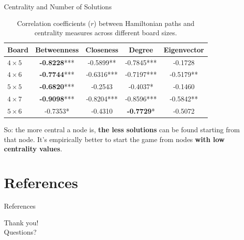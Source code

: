 \documentclass{beamer}
\begin{document}
	\begin{frame}{Centrality and Number of Solutions}
		\begin{table}[ht]
			\centering
			\setlength{\tabcolsep}{4pt}
			\begin{tabular}{|l|cccc|}
				\hline
				Board & Betweenness & Closeness & Degree & Eigenvector \\
				\hline
				$4 \times 5$ & \textbf{-0.8228}*** & -0.5899** & -0.7845*** & -0.1728 \\
				$4 \times 6$ & \textbf{-0.7744}*** & -0.6316*** & -0.7197*** & -0.5179** \\
				$5 \times 5$ & \textbf{-0.6820}*** & -0.2543 & -0.4037* & -0.1460 \\
				$4 \times 7$ & \textbf{-0.9098}*** & -0.8204*** & -0.8596*** & -0.5842** \\
				$5 \times 6$ & -0.7353* & -0.4310 & \textbf{-0.7729}* & -0.5072 \\
				\hline
			\end{tabular}
			\caption{Correlation coefficients ($r$) between Hamiltonian paths and centrality measures across different board sizes.}
			\label{tab:correlations}
		\end{table}
		So: the more central a node is, \textbf{the less solutions} can be found starting from that node. It's empirically better to start the game from nodes \textbf{with low centrality values}.
	\end{frame}
	
	\section{References}
	
	\begin{frame}[allowframebreaks]{References}
		\nocite{hopido,apoc,gds,np,warnsdorff}
	\end{frame}
	
	\begin{frame}
		\centering
		\Huge Thank you! \\
		\vspace{0.5cm}
		\normalsize Questions?
	\end{frame}
	
\end{document}
